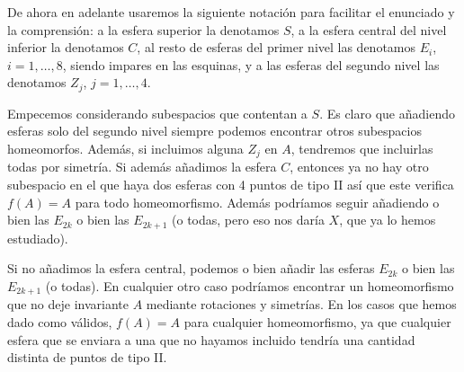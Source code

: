 \documentclass[twoside]{article}
\begin{document}
\begin{solucion}
De ahora en adelante usaremos la siguiente notación para facilitar el enunciado y la comprensión: a la esfera superior la denotamos $S$, a la esfera central del nivel inferior la denotamos $C$, al resto de esferas del primer nivel las denotamos $E_i$, $i=1,\dots, 8$, siendo impares en las esquinas, y a las esferas del segundo nivel las denotamos $Z_j$, $j=1,\dots, 4$.


Empecemos considerando subespacios que contentan a $S$. Es claro que añadiendo esferas solo del segundo nivel siempre podemos encontrar otros subespacios homeomorfos. Además, si incluimos alguna $Z_j$ en $A$, tendremos que incluirlas todas por simetría. Si además añadimos la esfera $C$, entonces ya no hay otro subespacio en el que haya dos esferas con 4 puntos de tipo II así que este verifica $f(A)=A$ para todo homeomorfismo. Además podríamos seguir añadiendo o bien las $E_{2k}$ o bien las $E_{2k+1}$ (o todas, pero eso nos daría $X$, que ya lo hemos estudiado). 

Si no añadimos la esfera central, podemos o bien añadir las esferas $E_{2k}$ o bien las $E_{2k+1}$ (o todas). En cualquier otro caso podríamos encontrar un homeomorfismo que no deje invariante $A$ mediante rotaciones y simetrías. En los casos que hemos dado como válidos, $f(A)=A$ para cualquier homeomorfismo, ya que cualquier esfera que se enviara a una que no hayamos incluido tendría una cantidad distinta de puntos de tipo II. 


\end{solucion}
\end{document}

